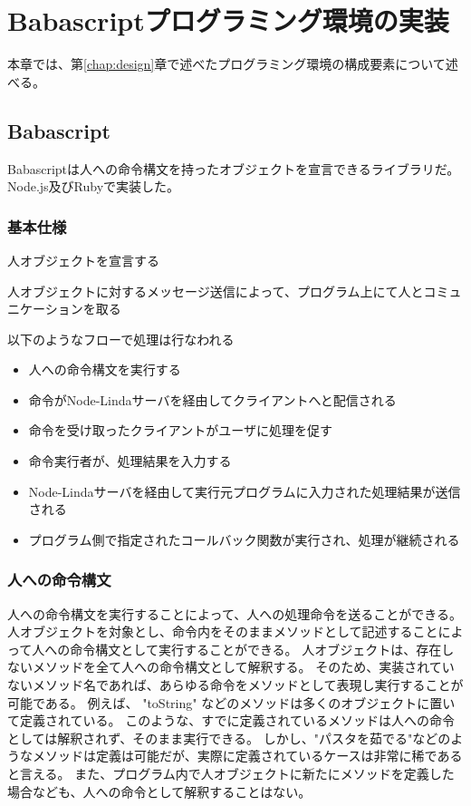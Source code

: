\chapter{Babascriptプログラミング環境の実装}
\label{chap:implementation}

本章では、第\ref{chap:design}章で述べたプログラミング環境の構成要素について述べる。

\section{Babascript}\label{babascript}

Babascriptは人への命令構文を持ったオブジェクトを宣言できるライブラリだ。
Node.js及びRubyで実装した。

\subsection{基本仕様}\label{ux57faux672cux4ed5ux69d8}

人オブジェクトを宣言する

人オブジェクトに対するメッセージ送信によって、プログラム上にて人とコミュニケーションを取る

以下のようなフローで処理は行なわれる

\begin{itemize}
\itemsep1pt\parskip0pt
\item
  人への命令構文を実行する
\item
  命令がNode-Lindaサーバを経由してクライアントへと配信される
\item
  命令を受け取ったクライアントがユーザに処理を促す
\item
  命令実行者が、処理結果を入力する
\item
  Node-Lindaサーバを経由して実行元プログラムに入力された処理結果が送信される
\item
  プログラム側で指定されたコールバック関数が実行され、処理が継続される
\end{itemize}

\subsection{人への命令構文}\label{ux4ebaux3078ux306eux547dux4ee4ux69cbux6587}

人への命令構文を実行することによって、人への処理命令を送ることができる。
人オブジェクトを対象とし、命令内をそのままメソッドとして記述することによって人への命令構文として実行することができる。
人オブジェクトは、存在しないメソッドを全て人への命令構文として解釈する。
そのため、実装されていないメソッド名であれば、あらゆる命令をメソッドとして表現し実行することが可能である。
例えば、 "toString"
などのメソッドは多くのオブジェクトに置いて定義されている。
このような、すでに定義されているメソッドは人への命令としては解釈されず、そのまま実行できる。
しかし、"パスタを茹でる"などのようなメソッドは定義は可能だが、実際に定義されているケースは非常に稀であると言える。
また、プログラム内で人オブジェクトに新たにメソッドを定義した場合なども、人への命令として解釈することはない。

